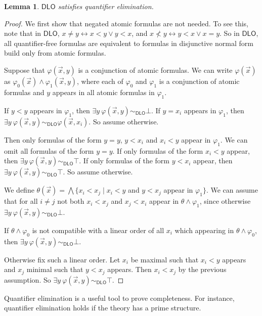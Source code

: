 \documentclass[a4paper, 11pt]{amsart}
\newtheorem{lemma}[lemma]{Lemma}
\theoremstyle{remark}
\begin{document}
\begin{lemma} 
$\mathsf{DLO}$ satisfies quantifier elimination. 
\end{lemma} 
\begin{proof} 
We first show that negated atomic formulas are not needed. 
To see this, note that in $\mathsf{DLO}$, $x \neq y \leftrightarrow x<y \vee y<x$, and $x\not<y \leftrightarrow y<x \vee x=y$. 
So in $\mathsf{DLO}$, all quantifier-free formulas are equivalent to formulas in disjunctive normal form build only from atomic formulas. 

Suppose that $\varphi(\vec{x},y)$ is a conjunction of atomic formulas. 
We can write $\varphi(\vec{x})$ as $\varphi_0(\vec{x}) \wedge \varphi_1 (\vec{x},y)$, where each of $\varphi_0$ and $\varphi_1$ is a conjunction of atomic formulas and $y$ appears in all atomic formulas in $\varphi_1$. 

If $y<y$ appears in $\varphi_1$, then $\exists y\ \varphi(\vec{x},y) \sim_{\mathsf{DLO}} \bot$. 
If $y=x_i$ appears in $\varphi_1$, then $\exists y\ \varphi(\vec{x},y) \sim_{\mathsf{DLO}} \varphi(\vec{x},x_i)$. 
So assume otherwise. 

Then only formulas of the form $y=y$, $y<x_i$ and $x_i<y$ appear in $\varphi_1$. 
We can omit all formulas of the form $y=y$. 
If only formulas of the form $x_i<y$ appear, then $\exists y\ \varphi(\vec{x},y) \sim_{\mathsf{DLO}} \top$. 
If only formulas of the form $y<x_i$ appear, then $\exists y\ \varphi(\vec{x},y) \sim_{\mathsf{DLO}} \top$. 
So assume otherwise. 

We define $\theta(\vec{x})=\bigwedge\{ x_i<x_j \mid x_i<y$ and $y<x_j$ appear in $\varphi_1\}$. 
We can assume that for all $i\neq j$ not both $x_i<x_j$ and $x_j<x_i$ appear in $\theta\wedge \varphi_1$, since otherwise  $\exists y\ \varphi(\vec{x},y) \sim_{\mathsf{DLO}} \bot$. 

If $\theta\wedge \varphi_0$ is not compatible with a linear order of all $x_i$ which appearing in $\theta\wedge \varphi_0$, then $\exists y\ \varphi(\vec{x},y) \sim_{\mathsf{DLO}} \bot$. 

Otherwise fix such a linear order. 
Let $x_i$ be maximal such that $x_i<y$ appears and $x_j$ minimal such that $y<x_j$ appears. 
Then $x_i<x_j$ by the previous assumption. 
So $\exists y\ \varphi(\vec{x},y) \sim_{\mathsf{DLO}} \top$. 
\end{proof} 


Quantifier elimination is a useful tool to prove completeness. For instance, quantifier elimination holds if the theory has a prime structure. 
\end{document}
